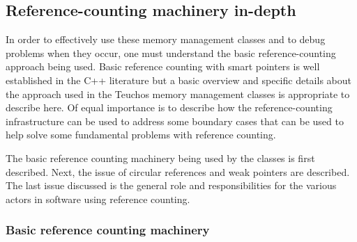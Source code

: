 \documentclass[pdf,ps2pdf,11pt]{SANDreport}
\begin{document}
%
{}\subsection{Reference-counting machinery in-depth}
\label{sec:reference-counting-machinary}
%

In order to effectively use these memory management classes and to
debug problems when they occur, one must understand the basic
reference-counting approach being used.  Basic reference counting with
smart pointers is well established in the C++ literature
{}\cite{MoreEffectiveC++96} but a basic overview and specific details
about the approach used in the Teuchos memory management classes is
appropriate to describe here.  Of equal importance is to describe how
the reference-counting infrastructure can be used to address some
boundary cases that can be used to help solve some fundamental
problems with reference counting.

The basic reference counting machinery being used by the classes is
first described.  Next, the issue of circular references and weak
pointers are described.  The last issue discussed is the general role
and responsibilities for the various actors in software using
reference counting.


%
{}\subsubsection{Basic reference counting machinery}
\label{sec:basic-reference-counting-machinery}
%
\end{document}
